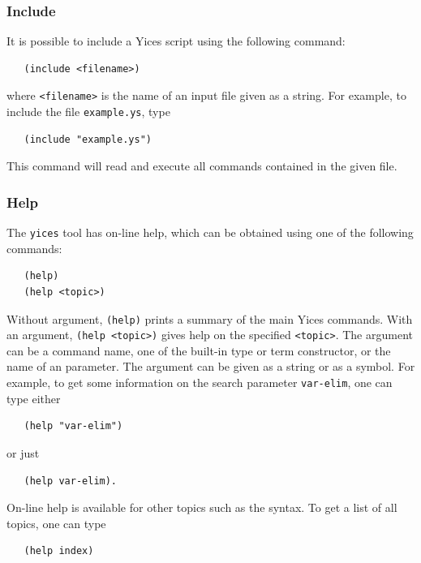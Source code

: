\documentclass[11pt,twoside,fleqn,openright,titlepage]{cslreport}
\begin{document}
\subsubsection*{Include}

It is possible to include a Yices script using the following command:
\begin{small}
\begin{verbatim}
   (include <filename>)
\end{verbatim}
\end{small}
where \texttt{<filename>} is the name of an input file given as a
string. For example, to include the file \texttt{example.ys}, type
\begin{small}
\begin{verbatim}
   (include "example.ys")
\end{verbatim}
\end{small}
This command will read and execute all commands contained in the given
file.

\subsubsection*{Help}

The \texttt{yices} tool has on-line help, which can be obtained using one
of the following commands:
\begin{small}
\begin{verbatim}
   (help)
   (help <topic>)
\end{verbatim}
\end{small}
Without argument, \texttt{(help)} prints a summary of the main Yices
  commands. With an argument, \texttt{(help <topic>)} gives help on
  the specified \texttt{<topic>}. The argument can be a command name,
  one of the built-in type or term constructor, or the name of an
  parameter.  The argument can be given as a string or as a
  symbol. For example, to get some information on the search parameter \texttt{var-elim},
one can type either
\begin{small}
\begin{verbatim}
   (help "var-elim")
\end{verbatim}
\end{small}
or just
\begin{small}
\begin{verbatim}
   (help var-elim).
\end{verbatim}
\end{small}
On-line help is available for other topics such as the syntax. To get a
list of all topics, one can type
\begin{small}
\begin{verbatim}
   (help index)
\end{verbatim}
\end{small}
\end{document}
